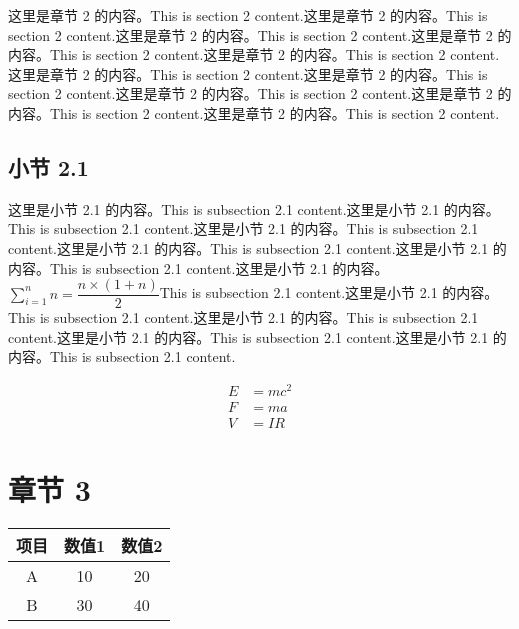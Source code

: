 \documentclass[UTF8]{article}
\begin{document}
	这里是章节 2 的内容。This is section 2 content.这里是章节 2 的内容。This is section 2 content.这里是章节 2 的内容。This is section 2 content.这里是章节 2 的内容。This is section 2 content.这里是章节 2 的内容。This is section 2 content.这里是章节 2 的内容。This is section 2 content.这里是章节 2 的内容。This is section 2 content.这里是章节 2 的内容。This is section 2 content.这里是章节 2 的内容。This is section 2 content.这里是章节 2 的内容。This is section 2 content.\cite{test2}

		\subsection{小节 2.1}

			这里是小节 2.1 的内容。This is subsection 2.1 content.这里是小节 2.1 的内容。This is subsection 2.1 content.这里是小节 2.1 的内容。This is subsection 2.1 content.这里是小节 2.1 的内容。This is subsection 2.1 content.这里是小节 2.1 的内容。This is subsection 2.1 content.这里是小节 2.1 的内容。$\sum_{i=1}^{n}n = \dfrac{n \times \left(1 + n\right)}{2}$This is subsection 2.1 content.这里是小节 2.1 的内容。This is subsection 2.1 content.这里是小节 2.1 的内容。This is subsection 2.1 content.这里是小节 2.1 的内容。This is subsection 2.1 content.这里是小节 2.1 的内容。This is subsection 2.1 content.\cite{test1}

			$$
				\begin{aligned}
					E & = mc^2 \\
					F & = ma \\
					V & = IR
				\end{aligned}
			$$

	\newpage
	\section{章节 3}

	\begin{figure}[htbp]
		\centering
		\label{fig:example}
	\end{figure}

	\begin{table}[htbp]
		\centering
		\begin{tabular}{ccc}
			\toprule
			项目 & 数值1 & 数值2 \\
			\midrule
			A & 10 & 20 \\
			B & 30 & 40 \\
			\bottomrule
		\end{tabular}
		\label{tab:example}
	\end{table}
\end{document}
